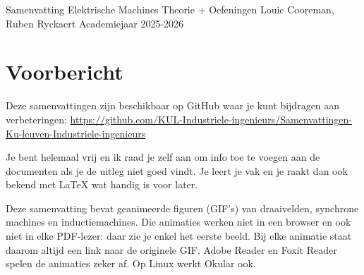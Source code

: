 \documentclass[a4paper,11pt,twoside]{report}
\begin{document}
\kuleuventitle
{Samenvatting Elektrische Machines Theorie + Oefeningen}
{}
{Louic Cooreman, Ruben Ryckaert}
{Academiejaar 2025-2026}
\newpage

\chapter*{Voorbericht}
Deze samenvattingen zijn beschikbaar op GitHub waar je kunt bijdragen aan verbeteringen:
\url{https://github.com/KUL-Industriele-ingenieurs/Samenvattingen-Ku-leuven-Industriele-ingenieurs}

Je bent helemaal vrij en ik raad je zelf aan om info toe te voegen aan de documenten als je
de uitleg niet goed vindt.
Je leert je vak en je raakt dan ook bekend met LaTeX wat handig is voor later.

Deze samenvatting bevat geanimeerde figuren (GIF's) van draaivelden, synchrone machines en
inductiemachines. Die animaties werken niet in een browser en ook niet in elke PDF-lezer: daar zie
je enkel het eerste beeld. Bij elke animatie staat daarom altijd een link naar de originele GIF.
Adobe Reader en Foxit Reader spelen de animaties zeker af. Op Linux werkt Okular ook.
\newpage

\tableofcontents
\newpage

\setcounter{chapter}{-1}








\end{document}
